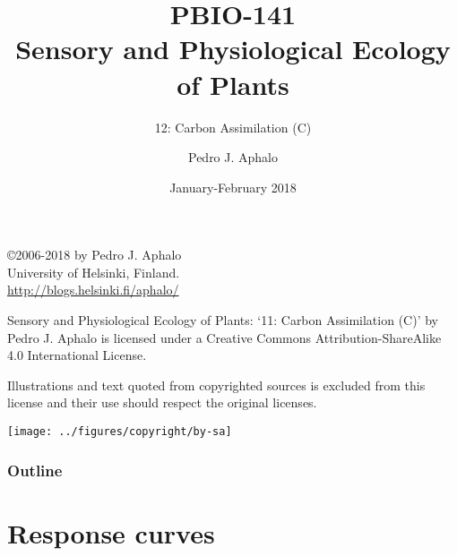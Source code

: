 \documentclass[10pt]{beamer}
\begin{document}
\title{PBIO-141\\Sensory and Physiological Ecology of  Plants}
\subtitle{12: Carbon Assimilation (C)}
\author{Pedro J. Aphalo}
\date{January-February 2018}


  \begin{frame}
    \maketitle
  \end{frame}

  \begin{frame}[c]
    \begin{center}
      \begin{small}
        \copyright 2006-2018 by Pedro J. Aphalo\\
       University of Helsinki, Finland.\\
        \textcolor{blue}{\url{http://blogs.helsinki.fi/aphalo/}}\\[2ex]
      \end{small}

      \begin{footnotesize}
        Sensory and Physiological Ecology of  Plants: `11: Carbon Assimilation (C)' by Pedro J. Aphalo is licensed under a Creative Commons Attribution-ShareAlike 4.0 International License.

        Illustrations and text quoted from copyrighted sources is excluded from this license and their use should respect the original licenses.\\[2ex]
      \end{footnotesize}

      \texttt{[image: ../figures/copyright/by-sa]}
    \end{center}
  \end{frame}

  \begin{frame}
    \frametitle{Outline}
    \tableofcontents
  \end{frame}


\section{Response curves}
\end{document}
